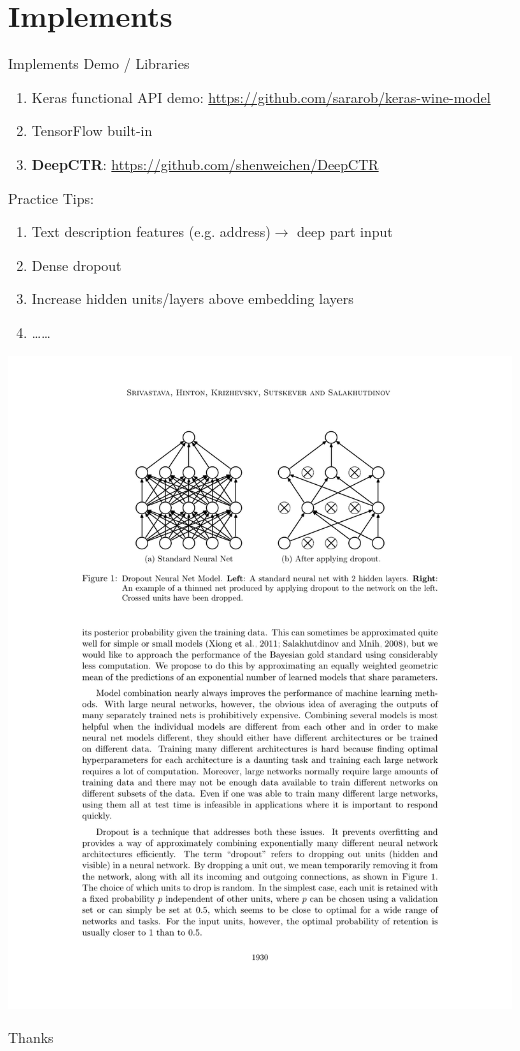 \documentclass{ctexbeamer}
\begin{document}
\section{Implements}
\begin{frame}{Implements}
Demo / Libraries
	\begin{enumerate}
		\item Keras functional API demo: \url{https://github.com/sararob/keras-wine-model}
		\item TensorFlow built-in
		\item \textbf{DeepCTR}: \url{https://github.com/shenweichen/DeepCTR}
	\end{enumerate}
	Practice Tips:
	\begin{enumerate}
		\item Text description features (e.g. address)$\to$ deep part input
		\item Dense dropout
		\item Increase hidden units/layers above embedding layers
		\item ……
	\end{enumerate}
	\centering
	\includegraphics[width=.5\textwidth]{dropout}
\end{frame}

\begin{frame}{}
	\centering
	\Huge{Thanks}
\end{frame}
\end{document}
